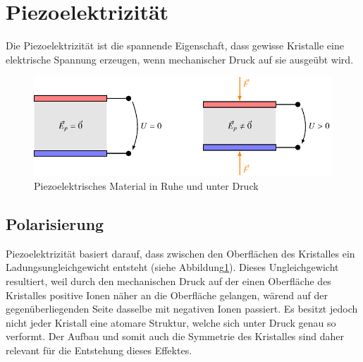 \section{Piezoelektrizität}
%
Die Piezoelektrizität ist die spannende Eigenschaft, dass gewisse Kristalle eine elektrische Spannung erzeugen, wenn mechanischer Druck auf sie ausgeübt wird.
%
%

\begin{figure}
    \centering
    \includegraphics[]{papers/punktgruppen/figures/piezo} %
    \caption{Piezoelektrisches Material in Ruhe und unter Druck}
    \label{fig:punktgruppen:basicPiezo}
\end{figure}

\subsection{Polarisierung}
%
Piezoelektrizität basiert darauf, dass zwischen den Oberflächen des Kristalles ein Ladungsungleichgewicht entsteht (siehe Abbildung\ref{fig:punktgruppen:basicPiezo}).
Dieses Ungleichgewicht resultiert, weil durch den mechanischen Druck auf der einen Oberfläche des Kristalles positive Ionen näher an die Oberfläche gelangen, wärend auf der gegenüberliegenden Seite dasselbe mit negativen Ionen passiert.
%
Es besitzt jedoch nicht jeder Kristall eine atomare Struktur, welche sich unter Druck genau so verformt.
Der Aufbau und somit auch die Symmetrie des Kristalles sind daher relevant für die Entstehung dieses Effektes.


